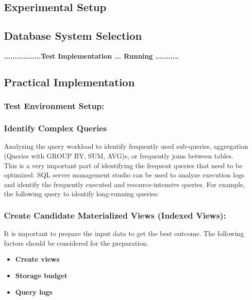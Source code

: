 \subsection{Experimental Setup}
\subsection{Database System Selection}



 \begin{center}
     \textbf{.................Test Implementation ... Running ...........}
 \end{center}

\subsection{Practical Implementation}
\subsubsection{Test Environment Setup:}
\subsubsection{Identify Complex Queries} Analyzing the query workload to identify frequently used sub-queries, aggregation (Queries with GROUP BY, SUM, AVG)s, or frequently joins between tables. This is a very important part of identifying the frequent queries that need to be optimized. SQL server management studio can be used to analyze execution logs and identify the frequently executed and resource-intensive queries. For example, the following query to identify long-running queries:



\subsubsection{ Create Candidate Materialized Views (Indexed Views):} It is important to prepare the input data to get the best outcome. The following factors should be considered for the preparation. 

  \begin{itemize}
      \item \textbf{Create views}
      \item \textbf{Storage budget}
      \item \textbf{Query logs}
  \end{itemize}


